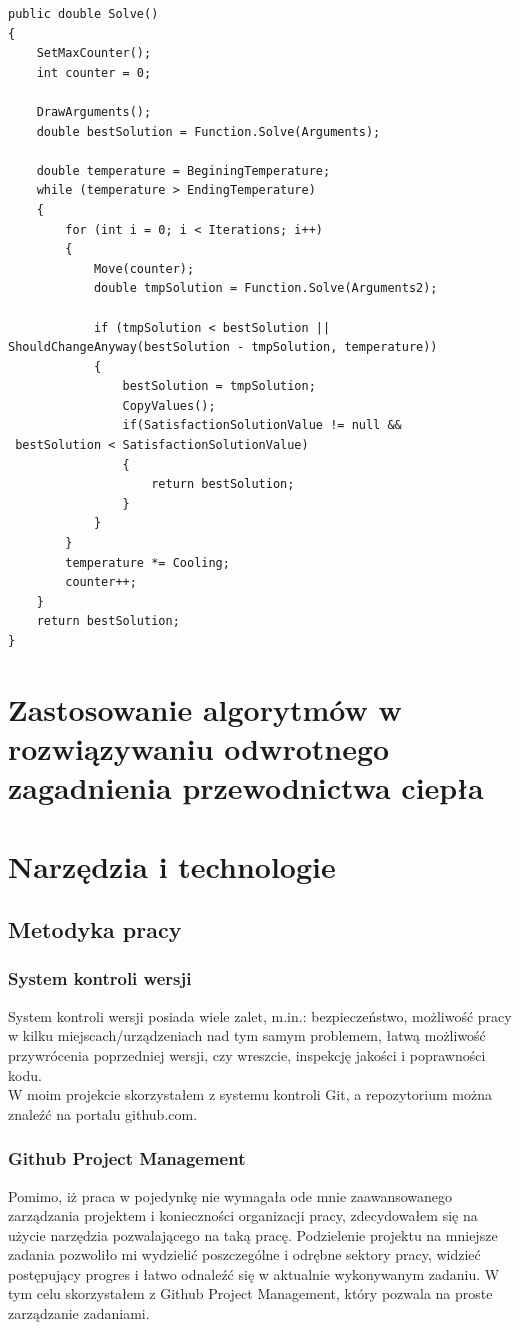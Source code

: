 \documentclass[twoside]{projektInzynierskiMS1}
\newcommand{\si}{ś}
\begin{document}
\begin{verbatim}
public double Solve()
{
    SetMaxCounter();
    int counter = 0;

    DrawArguments();
    double bestSolution = Function.Solve(Arguments);

    double temperature = BeginingTemperature;
    while (temperature > EndingTemperature)
    {
        for (int i = 0; i < Iterations; i++)
        {
            Move(counter);
            double tmpSolution = Function.Solve(Arguments2);

            if (tmpSolution < bestSolution || 
ShouldChangeAnyway(bestSolution - tmpSolution, temperature))
            {
                bestSolution = tmpSolution;
                CopyValues();
                if(SatisfactionSolutionValue != null &&
 bestSolution < SatisfactionSolutionValue)
                {
                    return bestSolution;
                }
            }
        }
        temperature *= Cooling;
        counter++;
    }
    return bestSolution;
}
\end{verbatim}

\section{Zastosowanie algorytmów w rozwiązywaniu odwrotnego zagadnienia przewodnictwa ciepła}
\section{Narzędzia i technologie}
	\subsection{Metodyka pracy}
	\subsubsection{System kontroli wersji}
	System kontroli wersji posiada wiele zalet, m.in.: bezpieczeństwo, możliwo\si ć pracy w kilku miejscach/urządzeniach nad tym samym problemem, łatwą możliwo\si ć przywrócenia poprzedniej wersji, czy wreszcie, inspekcję jako\si ci i poprawno\si ci kodu. \\
W moim projekcie skorzystałem z systemu kontroli Git, a repozytorium można znaleźć na portalu github.com. 
	\subsubsection{Github Project Management}
Pomimo, iż praca w pojedynkę nie wymagała ode mnie zaawansowanego zarządzania projektem i konieczno\si ci organizacji pracy, zdecydowałem się na użycie narzędzia pozwalającego na taką pracę. Podzielenie projektu na mniejsze zadania pozwoliło mi wydzielić poszczególne i odrębne sektory pracy, widzieć postępujący progres i łatwo odnaleźć się w aktualnie wykonywanym zadaniu. W tym celu skorzystałem z Github Project Management, który pozwala na proste zarządzanie zadaniami.
\end{document}
